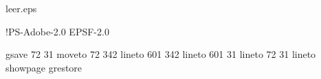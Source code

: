 %
%
%
%
\begin{filecontents}{leer.eps}

!PS-Adobe-2.0 EPSF-2.0

gsave
72 31 moveto
72 342 lineto
601 342 lineto
601 31 lineto
72 31 lineto
showpage
grestore
\end{filecontents}
%
\documentclass[epj]{svjour}
%
\usepackage{mathtools} %
\usepackage{graphics}
\usepackage{amsmath}
\usepackage{amssymb}
\usepackage{latexsym}
\usepackage{amsfonts}
\usepackage{authblk}
\usepackage{xfrac}
\usepackage{graphicx}
\usepackage{gensymb}  %
\usepackage{color}
\usepackage{bm}
\usepackage{multirow}
\usepackage{cite}
\usepackage{tikz}
\usetikzlibrary{arrows, arrows.meta}

\usepackage [english]{babel}
\usepackage [autostyle, english = american]{csquotes}

%

\newcommand{\eq}[1]{Eq.~(\ref{#1})}
\newcommand{\eqnolabel}[1]{(\ref{#1})}
\newcommand{\eqs}[1]{Eqs.~(\ref{#1})}
\newcommand{\eqsthru}[2]{Eqs.~(\ref{#1})--(\ref{#2})}
\newcommand{\eqsand}[2]{Eqs.~(\ref{#1}) and (\ref{#2})}
\newcommand{\tbl}[1]{Table~\ref{#1}}
\newcommand{\tblnolabel}[1]{\ref{#1}}
\newcommand{\tbls}[1]{Tables~\ref{#1}}
\newcommand{\tblsthru}[2]{Tables~\ref{#1}--\ref{#2}}
\newcommand{\tblsand}[2]{Tables~\ref{#1} and \ref{#2}}
\newcommand{\fig}[1]{Fig.~\ref{#1}}
\newcommand{\fignolabel}[1]{\ref{#1}}
\newcommand{\figs}[1]{Figs.~\ref{#1}}
\newcommand{\figsthru}[2]{Figs.~\ref{#1}--\ref{#2}}
\newcommand{\figsand}[2]{Figs.~\ref{#1} and \ref{#2}}
\newcommand{\sxn}[1]{Section~\ref{#1}}

\newcommand{\revised}[1]{{\color{red}{#1}}}
\newcommand{\tsup}[1]{\textsuperscript{#1}}
\newcommand{\tsub}[1]{\textsubscript{#1}}

